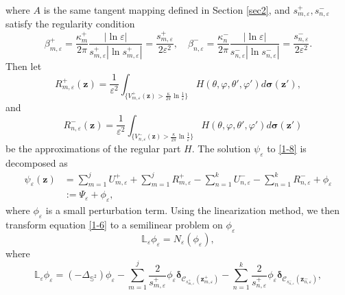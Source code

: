 \documentclass[12pt,reqno]{amsart}
\numberwithin{equation}{section}
\theoremstyle{definition}
\theoremstyle{remark}
\begin{document}
	where $A$ is the same tangent mapping defined in Section \ref{sec2}, and $s_{m,\varepsilon}^+,s_{n,\varepsilon}^-$ satisfy the regularity condition
	\begin{equation*}
		\beta_{m,\varepsilon}^+=\frac{\kappa_m^+}{2\pi}\frac{|\ln\varepsilon|}{s_{m,\varepsilon}^+|\ln s_{m,\varepsilon}^+|}=\frac{s_{m,\varepsilon}^+}{2\varepsilon^2}, \quad \beta_{n,\varepsilon}^-=\frac{\kappa_n^-}{2\pi}\frac{|\ln\varepsilon|}{s_{n,\varepsilon}^-|\ln s_{n,\varepsilon}^-|}=\frac{s_{n,\varepsilon}^-}{2\varepsilon^2}.
	\end{equation*}
	Then let
	\begin{equation*}
		R^+_{m,\varepsilon}(\boldsymbol z)=\frac{1}{\varepsilon^2}\int_{\{V^+_{m,\varepsilon}(\boldsymbol z)>\frac{\kappa}{2\pi}\ln\frac{1}{\varepsilon}\}} H(\theta,\varphi,\theta',\varphi')d\boldsymbol \sigma(\boldsymbol z'), 
	\end{equation*}
	and
	\begin{equation*}	
		\quad R^-_{n,\varepsilon}(\boldsymbol z)=\frac{1}{\varepsilon^2}\int_{\{V^-_{n,\varepsilon}(\boldsymbol z)>\frac{\kappa}{2\pi}\ln\frac{1}{\varepsilon}\}} H(\theta,\varphi,\theta',\varphi')d\boldsymbol \sigma(\boldsymbol z')
	\end{equation*}
	be the approximations of the regular part $H$. The solution $\psi_\varepsilon$ to \eqref{1-8} is decomposed as
	\begin{align*}
		\psi_\varepsilon(\boldsymbol z)&=\sum\limits_{m=1}^jU^+_{m,\varepsilon}+\sum\limits_{m=1}^jR^+_{m,\varepsilon}-\sum\limits_{n=1}^kU^-_{n,\varepsilon}-\sum\limits_{n=1}^kR^-_{n,\varepsilon}+\phi_\varepsilon\\
		&:=\Psi_\varepsilon+\phi_\varepsilon, 
    \end{align*}	
	where $\phi_\varepsilon$ is a small perturbation term. Using the linearization method, we then transform equation \eqref{1-6} to a semilinear problem on $\phi_\varepsilon$
	\begin{equation}\label{3-1}
		\mathbb L_\varepsilon\phi_\varepsilon=N_\varepsilon(\phi_\varepsilon),
	\end{equation}
	where
	\begin{equation*}
	\mathbb L_\varepsilon\phi_\varepsilon=(-\Delta_{\mathbb S^2})\phi_\varepsilon-\sum\limits_{m=1}^j\frac{2}{s_{m,\varepsilon}^+}\phi_\varepsilon\boldsymbol\delta_{\mathcal C_{s_{m,\varepsilon}^+}(\boldsymbol z_{m,\varepsilon}^+)}-\sum\limits_{n=1}^k\frac{2}{s_{n,\varepsilon}^+}\phi_\varepsilon\boldsymbol\delta_{\mathcal C_{s_{n,\varepsilon}^-}(\boldsymbol z_{n,\varepsilon}^-)},
	\end{equation*}
\end{document}
